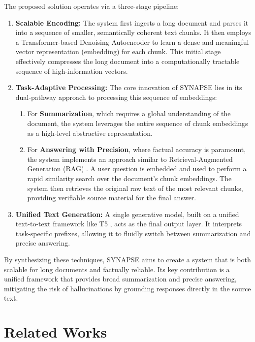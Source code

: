 \documentclass[11pt]{article}
\begin{document}
The proposed solution operates via a three-stage pipeline:
\begin{enumerate}
    \item \textbf{Scalable Encoding: }The system first ingests a long document and parses it into a sequence of smaller, semantically coherent text chunks. It then employs a Transformer-based Denoising Autoencoder to learn a dense and meaningful vector representation (embedding) for each chunk. This initial stage effectively compresses the long document into a computationally tractable sequence of high-information vectors.
    \item \textbf{Task-Adaptive Processing: }The core innovation of SYNAPSE lies in its dual-pathway approach to processing this sequence of embeddings:
    \begin{enumerate}
        \item For \textbf{Summarization}, which requires a global understanding of the document, the system leverages the entire sequence of chunk embeddings as a high-level abstractive representation.
        \item For \textbf{Answering with Precision}, where factual accuracy is paramount, the system implements an approach similar to Retrieval-Augmented Generation (RAG) \citep{lewis2021retrievalaugmentedgenerationknowledgeintensivenlp}. A user question is embedded and used to perform a rapid similarity search over the document's chunk embeddings. The system then retrieves the original raw text of the most relevant chunks, providing verifiable source material for the final answer.
    \end{enumerate}
    \item \textbf{Unified Text Generation: }A single generative model, built on a unified text-to-text framework like T5 \citep{raffel2023exploringlimitstransferlearning}, acts as the final output layer. It interprets task-specific prefixes, allowing it to fluidly switch between summarization and precise answering.
\end{enumerate}

By synthesizing these techniques, SYNAPSE aims to create a system that is both scalable for long documents and factually reliable. Its key contribution is a unified framework that provides broad summarization and precise answering, mitigating the risk of hallucinations by grounding responses directly in the source text.

\section{Related Works}
\end{document}
